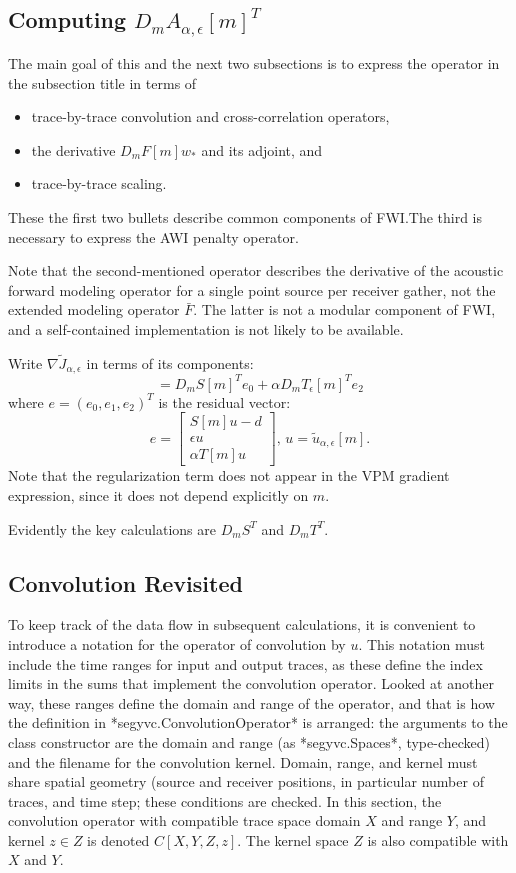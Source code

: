 \subsection{Computing $D_mA_{\alpha,\epsilon}[m]^T$}
The main goal of this and the next two subsections is to express the
operator in the subsection title in terms of
\begin{itemize}
  \item trace-by-trace convolution and cross-correlation operators,
  \item the derivative $D_mF[m]w_*$ and its adjoint, and
  \item trace-by-trace scaling.
\end{itemize}
These the first two bullets describe common components of FWI.The
third is necessary to express the AWI penalty operator.

Note that the second-mentioned operator describes the derivative of
the acoustic forward modeling operator for a single point source per
receiver gather, not the extended modeling operator $\bar{F}$. The
latter is not a modular component of FWI, and a self-contained
implementation is not likely to be available.

Write $\nabla \tilde{J}_{\alpha,\epsilon}$ in terms of its components:
\begin{equation}
= D_mS[m]^T e_0 + \alpha D_mT_{\epsilon}[m]^Te_2
\label{eqn:tildejgrad}
\end{equation}
where $e=(e_0,e_1,e_2)^T$ is the residual vector:
$$
e = \left[
\begin{array}{c}
S[m]u-d\\
\epsilon u\\
\alpha T[m]u
\end{array}
\right],\, u=\tilde{u}_{\alpha,\epsilon}[m].
$$
Note that the regularization term does not appear in the VPM gradient expression, since it does not depend explicitly on $m$.

Evidently the key calculations are $D_mS^T$ and $D_m T^T$. 

\subsection{Convolution Revisited}

To keep track of the data flow in subsequent calculations, it is convenient to introduce a notation for the operator of convolution by $u$. This notation must include the time ranges for input and output traces, as these define the index limits in the sums that implement the convolution operator. Looked at another way, these ranges define the domain and range of the operator, and that is how the definition in *segyvc.ConvolutionOperator* is arranged: the arguments to the class constructor are the domain and range (as *segyvc.Spaces*, type-checked) and the filename for the convolution kernel. Domain, range, and kernel must share spatial geometry (source and receiver positions, in particular number of traces, and time step; these conditions are checked. In this section, the convolution operator with compatible trace space domain $X$ and range $Y$, and kernel $z \in Z$ is denoted $C[X,Y,Z,z]$. The kernel space $Z$ is also compatible with $X$ and $Y$.

